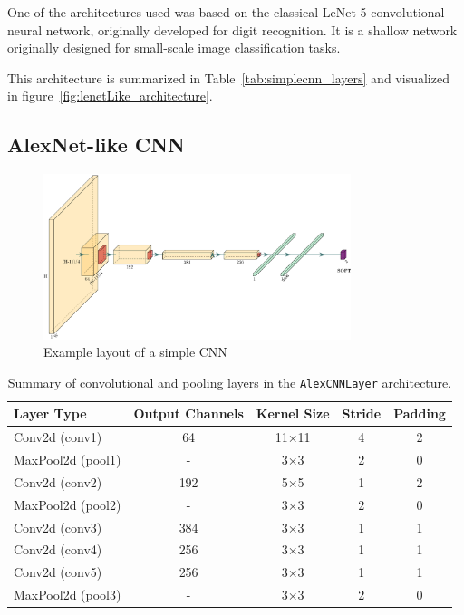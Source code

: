 \documentclass{pracalicmgr}
\begin{document}
One of the architectures used was based on the classical LeNet-5 convolutional neural network, originally developed for digit recognition. It is a shallow network originally designed for small-scale image classification tasks\cite{LeNet}.

This architecture is summarized in Table~\ref{tab:simplecnn_layers} and visualized in figure~\ref{fig:lenetLike_architecture}.

\subsection{AlexNet-like CNN}

\begin{figure}[H]
    \centering
    \includegraphics[width=0.8\textwidth]{src/AlexNetLike.pdf}
    \caption{Example layout of a simple CNN\cite{Iqbal2018PlotNeuralNet}}
    \label{fig:alexnetLike_architecture}
\end{figure}

\begin{table}[H]
\centering
\caption{Summary of convolutional and pooling layers in the \texttt{AlexCNNLayer} architecture.}
\begin{tabular}{|l|c|c|c|c|}
\hline
\textbf{Layer Type} & \textbf{Output Channels} & \textbf{Kernel Size} & \textbf{Stride} & \textbf{Padding} \\
\hline
Conv2d (conv1) & 64 & 11×11 & 4 & 2 \\
MaxPool2d (pool1) & - & 3×3 & 2 & 0 \\
Conv2d (conv2) & 192 & 5×5 & 1 & 2 \\
MaxPool2d (pool2) & - & 3×3 & 2 & 0 \\
Conv2d (conv3) & 384 & 3×3 & 1 & 1 \\
Conv2d (conv4) & 256 & 3×3 & 1 & 1 \\
Conv2d (conv5) & 256 & 3×3 & 1 & 1 \\
MaxPool2d (pool3) & - & 3×3 & 2 & 0 \\
\hline
\end{tabular}
\label{tab:alexcnn_layers}
\end{table}
\end{document}
